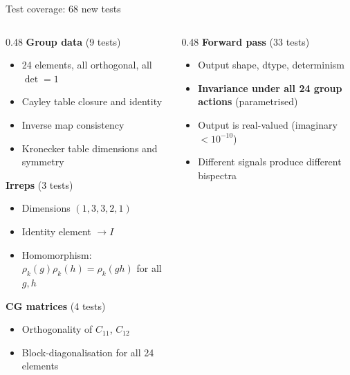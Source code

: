 \documentclass[aspectratio=169]{beamer}
\begin{document}
\begin{frame}{Test coverage: 68 new tests}
  \begin{columns}[T]
    \begin{column}{0.48\textwidth}
      \textbf{Group data} (9 tests)
      \begin{itemize}\scriptsize
        \item 24 elements, all orthogonal, all $\det = 1$
        \item Cayley table closure and identity
        \item Inverse map consistency
        \item Kronecker table dimensions and symmetry
      \end{itemize}

      \bigskip

      \textbf{Irreps} (3 tests)
      \begin{itemize}\scriptsize
        \item Dimensions $(1, 3, 3, 2, 1)$
        \item Identity element $\to I$
        \item Homomorphism: $\rho_k(g)\rho_k(h) = \rho_k(gh)$ for all $g,h$
      \end{itemize}

      \bigskip

      \textbf{CG matrices} (4 tests)
      \begin{itemize}\scriptsize
        \item Orthogonality of $C_{11}$, $C_{12}$
        \item Block-diagonalisation for all 24 elements
      \end{itemize}
    \end{column}
    \begin{column}{0.48\textwidth}
      \textbf{Forward pass} (33 tests)
      \begin{itemize}\scriptsize
        \item Output shape, dtype, determinism
        \item \textbf{Invariance under all 24 group actions} (parametrised)
        \item Output is real-valued (imaginary $< 10^{-10}$)
        \item Different signals produce different bispectra
      \end{itemize}

      \bigskip


\end{column}
\end{columns}
\end{frame}
\end{document}
